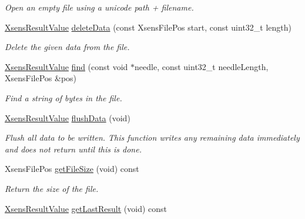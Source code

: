 \begin{DoxyCompactItemize}
\begin{DoxyCompactList}\small\item\em \-Open an empty file using a unicode path + filename. \end{DoxyCompactList}\item 
\hyperlink{group__enums_ga822a2260a20af524029eef9e9a51ff6f}{\-Xsens\-Result\-Value} \hyperlink{classxsens_1_1Cmt1f_a51f143e00f87b2cfab723654bac58ec1}{delete\-Data} (const \-Xsens\-File\-Pos start, const uint32\-\_\-t length)
\begin{DoxyCompactList}\small\item\em \-Delete the given data from the file. \end{DoxyCompactList}\item 
\hyperlink{group__enums_ga822a2260a20af524029eef9e9a51ff6f}{\-Xsens\-Result\-Value} \hyperlink{classxsens_1_1Cmt1f_a0ddcd0eb51efc0a53348b8cdb2d82d7a}{find} (const void $\ast$needle, const uint32\-\_\-t needle\-Length, \-Xsens\-File\-Pos \&pos)
\begin{DoxyCompactList}\small\item\em \-Find a string of bytes in the file. \end{DoxyCompactList}\item 
\hypertarget{classxsens_1_1Cmt1f_aebb4f05e2a6b0006da18fd7b21443a89}{\hyperlink{group__enums_ga822a2260a20af524029eef9e9a51ff6f}{\-Xsens\-Result\-Value} \hyperlink{classxsens_1_1Cmt1f_aebb4f05e2a6b0006da18fd7b21443a89}{flush\-Data} (void)}\label{classxsens_1_1Cmt1f_aebb4f05e2a6b0006da18fd7b21443a89}

\begin{DoxyCompactList}\small\item\em \-Flush all data to be written. \-This function writes any remaining data immediately and does not return until this is done. \end{DoxyCompactList}\item 
\hypertarget{classxsens_1_1Cmt1f_af4b0d90ae27736caa5f9b9c848c7e08b}{\-Xsens\-File\-Pos \hyperlink{classxsens_1_1Cmt1f_af4b0d90ae27736caa5f9b9c848c7e08b}{get\-File\-Size} (void) const }\label{classxsens_1_1Cmt1f_af4b0d90ae27736caa5f9b9c848c7e08b}

\begin{DoxyCompactList}\small\item\em \-Return the size of the file. \end{DoxyCompactList}\item 
\hypertarget{classxsens_1_1Cmt1f_ac1177c0bb97bdeacac9ccc21d3f8646d}{\hyperlink{group__enums_ga822a2260a20af524029eef9e9a51ff6f}{\-Xsens\-Result\-Value} \hyperlink{classxsens_1_1Cmt1f_ac1177c0bb97bdeacac9ccc21d3f8646d}{get\-Last\-Result} (void) const }\label{classxsens_1_1Cmt1f_ac1177c0bb97bdeacac9ccc21d3f8646d}


\end{DoxyCompactItemize}
